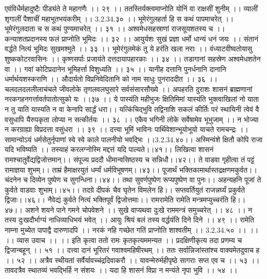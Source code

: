 एवंविधैर्महादुष्टैः पीड्यंते ते महागणैः ।। २९ ।।
ततस्तिर्यक्त्वमाप्नोति योनिं वा राक्षसीं शुनीम् ।।
व्यालीं शृगालीं पैशाचीं महाभूतभयंकरीम् ।। 3.2.34.३० ।।
भूमेरंगुलहर्ता हि स कथं पापमाचरेत् ।।
भूमेरंगुलदाता च स कथं पुण्यमाचरेत् ।। ३१ ।।
अश्वमेधसहस्राणां राजसूयशतस्य च ।।
कन्याशतप्रदानस्य फलं प्राप्नोति भूमिदः ।। ३२ ।।
आयुर्यशः सुखं प्रज्ञा धर्मो धान्यं धनं जयः ।।
संतानं वर्द्धते नित्यं भूमिदः सुखमश्मुते ।। ३३ ।।
भूमेरंगुलमेकं तु ये हरंति खला नराः ।।
वंध्याटवीष्वतोयासु शुष्ककोटरवासिनः ।।
कृष्णसर्पाः प्रजायंते दत्तदायापहारकाः ।। ३४ ।।
तडागानां सहस्रेण अश्वमेधशतेन वा ।।
गवां कोटिप्रदानेन भूमिहर्त्ता विशुध्यति ।। ३५ ।।
यानीह दत्तानि पुनर्धनानि दानानि धर्मार्थयशस्कराणि ।।
औदार्यतो विप्रनिवेदितानि को नाम साधुः पुनराददीत ।। ३६ ।।
चलदलदललीलाचंचले जीवलोके तृणलवलघुसारे सर्वसंसारसौख्ये ।।
अपहरति दुराशः शासनं ब्राह्मणानां नरकगहनगर्त्तावर्तपातोत्सुको यः ।।३७ ।।
ये पास्यंति महीभुजः क्षितिमिमां यास्यंति भुक्त्वाखिलां नो याता न तु याति यास्यति न वा केनापि सार्द्धं धरा।।
यत्किंचिद्भुवि तद्विनाशि सकलं कीर्तिः परं स्थायिनी त्वेवं वै वसुधापि यैरुपकृता लोप्या न सत्कीर्तयः ।। ३८ ।।
एकैव भगिनी लोके सर्वेषामेव भूभुजाम् ।।
न भोज्या न करग्राह्या विप्रदत्ता वसुंधरा ।। ३९ ।।
दत्त्वा भूमिं भाविनः पार्थिवेशान्भूयोभूयो याचते रामचन्द्रः ।।
सामान्योऽयं धर्मसेतुर्नृपाणां स्वे स्वे काले पालनीयो भवद्भिः ।।3.2.34.४०।।
अस्मिन्वंशे क्षितौ कोपि राजा यदि भविष्यति ।।
तस्याहं करलग्नोस्मि मद्दत्तं यदि पाल्यते।।४१।।
लिखित्वा शासनं रामश्चातुर्वेद्यद्विजोत्तमान्।।
संपूज्य प्रददौ धीमान्वसिष्ठस्य च सन्निधौ।।४२।।
ते वाडवा गृहीत्वा तं पट्टं रामाज्ञया शुभम्।।
ताम्रं हैमाक्षरयुतं धर्म्यं धर्मविभूषणम्।।४३।।
पूजार्थं भक्तिकामार्थास्तद्रक्षणमकुर्वत।।
चंदनेन च दिव्येन पुष्पेण च सुगन्धिना।।४४।।
तथा सुवर्णपुष्पेण रूप्यपुष्पेण वा पुनः।।
अहन्यहनि पूजां ते कुर्वते वाडवाः शुभाम्।।४५।।
तदग्रे दीपकं चैव घृतेन विमलेन हि।।
सप्तवर्तियुतं राजन्नर्घ्यं प्रकुर्वते द्विजाः।।४६।।
नैवेद्यं कुर्वते नित्यं भक्तिपूर्वं द्विजोत्तमाः।।
रामरामेति रामेति मन्त्रमप्युच्चरंति हि।।४७।।
अशने शयने पाने गमने चोपवेशने ।।
सुखे वाप्यथवा दुःखे राममन्त्रं समुच्चरेत् ।। ४८ ।।
न तस्य दुःखदौर्भाग्यं नाधिव्याधिभयं भवेत् ।।
आयुः श्रियं बलं तस्य वर्द्धयंति दिने दिने ।। ४९ ।।
रामेति नाम्ना मुच्येत पापाद्वै दारुणादपि ।।
नरकं नहि गच्छेत गतिं प्राप्नोति शाश्वतीम् ।। 3.2.34.५० ।। ।।
।। व्यास उवाच ।। ।।
इति कृत्वा ततो रामः कृतकृत्यममन्यत ।।
प्रदक्षिणीकृत्य तदा प्रणम्य च द्विजान्बहून् ।। ५१ ।।
दत्त्वा दानं भूरितरं गवाश्वमहिषीरथम् ।।
ततः सर्वान्निजांस्तांश्च वाक्यमेतदुवाच ह ।। ५२ ।।
अत्रैव स्थीयतां सर्वैर्यावच्चंद्रदिवाकरौ ।।
यावन्मेरुर्महीपृष्ठे सागराः सप्त एव च ।। ५३ ।।
तावदत्रैव स्थातव्यं भवद्भिर्हि न संशयः ।।
यदा हि शासनं विप्रा न मन्यंते नृपा भुवि ।। ५४ ।।
